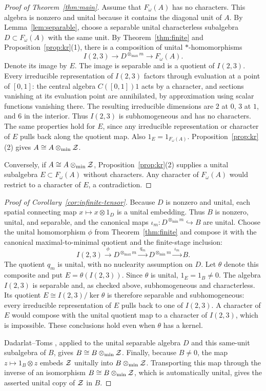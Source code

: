 \begin{proof}[Proof of Theorem~\ref{thm:main}]
Assume that $F_\omega(A)$ has no characters. This algebra is nonzero and
unital because it contains the diagonal unit of $A$. By
Lemma~\ref{lem:separable}, choose a separable unital characterless
subalgebra $D\subset F_\omega(A)$ with the same unit. By
Theorem~\ref{thm:finite} and Proposition~\ref{prop:kr}(1), there is a
composition of unital $*$-homomorphisms
\[
 I(2,3)\longrightarrow D^{\otimes_{\max}m}
 \longrightarrow F_\omega(A).
\]
Denote its image by $E$. The image is separable and is a quotient of
$I(2,3)$. Every irreducible representation of $I(2,3)$ factors through
evaluation at a point of $[0,1]$: the central algebra $C([0,1])1$ acts
by a character, and sections vanishing at its evaluation point are
annihilated, by approximation using scalar functions vanishing there.
The resulting irreducible dimensions are $2$ at $0$, $3$ at $1$, and
$6$ in the interior. Thus $I(2,3)$ is subhomogeneous and has no
characters. The same properties hold for $E$, since any irreducible
representation or character of $E$ pulls back along the quotient map.
Also $1_E=1_{F_\omega(A)}$. Proposition~\ref{prop:kr}(2) gives
$A\cong A\otimes_{\min}\mathcal Z$.

Conversely, if $A\cong A\otimes_{\min}\mathcal Z$, Proposition~\ref{prop:kr}(2)
supplies a unital subalgebra $E\subset F_\omega(A)$ without characters.
Any character of $F_\omega(A)$ would restrict to a character of $E$,
a contradiction.
\end{proof}

\begin{proof}[Proof of Corollary~\ref{cor:infinite-tensor}]
Because $D$ is nonzero and unital, each spatial connecting map
$x\mapsto x\otimes1_D$ is a unital embedding. Thus $B$ is nonzero, unital,
and separable, and the canonical maps
$\iota_m:D^{\otimes_{\min}m}\hookrightarrow B$ are unital.
Choose the unital homomorphism $\phi$ from Theorem~\ref{thm:finite} and
compose it with the canonical maximal-to-minimal quotient and the
finite-stage inclusion:
\[
 I(2,3)\xrightarrow{\ \phi\ }D^{\otimes_{\max}m}
 \xrightarrow{\ q_m\ }D^{\otimes_{\min}m}
 \xrightarrow{\ \iota_m\ }B.
\]
The quotient $q_m$ is unital, with no nuclearity assumption on $D$.
Let $\theta$ denote this composite and put $E=\theta(I(2,3))$.
Since $\theta$ is unital, $1_E=1_B\ne0$.
The algebra $I(2,3)$ is separable and, as checked above, subhomogeneous
and characterless. Its quotient $E\cong I(2,3)/\ker\theta$ is therefore
separable and subhomogeneous: every irreducible representation of $E$
pulls back to one of $I(2,3)$. A character of $E$ would compose with the
unital quotient map to a character of $I(2,3)$, which is impossible.
These conclusions hold even when $\theta$ has a kernel.

Dadarlat--Toms \cite[Theorem~1.1]{DT}, applied to the unital separable
algebra $D$ and this same-unit subalgebra of $B$, gives
$B\cong B\otimes_{\min}\mathcal Z$. Finally, because $B\ne0$, the map
$z\mapsto1_B\otimes z$ embeds $\mathcal Z$ unitally into $B\otimes_{\min}\mathcal Z$.
Transporting this map through the inverse of an isomorphism
$B\cong B\otimes_{\min}\mathcal Z$, which is automatically unital, gives the asserted
unital copy of $\mathcal Z$ in $B$.
\end{proof}
